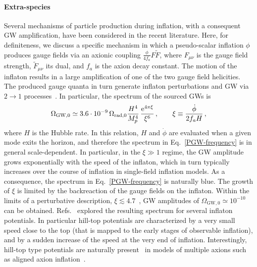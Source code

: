 \documentclass[11pt,a4paper]{article}
\begin{document}
\paragraph{Extra-species}
Several mechanisms of particle production during inflation, with a consequent GW amplification, have been considered in the recent literature. Here, for definiteness, we discuss a specific mechanism in which a pseudo-scalar inflation $\phi$ produces gauge fields via an axionic coupling $\frac{\phi }{4 f_a} F {\tilde F}$,  where $F_{\mu \nu}$ is the gauge field strength,  ${\tilde F}_{\mu \nu}$ its dual, and $f_a$ is the axion decay constant. The motion of the inflaton results in a large amplification of one of the two gauge field helicities. The produced gauge quanta in turn generate inflaton perturbations and GW via $2 \to 1$ processes~\cite{Barnaby:2010vf,Sorbo:2011rz}. In particular, the spectrum of the sourced GWs is~\cite{Barnaby:2010vf}
%
\begin{equation}
\Omega_{\rm GW, 0} \simeq 3.6 \cdot 10^{-9} \, \Omega_{\text{rad},0} \frac{H^4}{M_p^4} \, \frac{{\rm e}^{4 \pi \xi}}{\xi^6}\,, \qquad
\xi \equiv \frac{\dot{\phi}}{2 f_a H} \,,
\label{PGW-frequency}
\end{equation}
%
where $H$ is the Hubble rate. In this relation, $H$ and $\dot{\phi}$ are evaluated when a given mode exits the horizon, and therefore the spectrum in Eq.~\eqref{PGW-frequency} is in general scale-dependent. In particular, in the $\xi \gg 1$ regime, the GW amplitude grows exponentially with  the speed of the inflaton, which in turn typically increases over the course of inflation in single-field inflation models. As a consequence, the spectrum in Eq.~\eqref{PGW-frequency} is naturally blue. The growth of $\xi$ is limited by the backreaction of the gauge fields on the inflaton. {Within the limits of a perturbative description, $\xi \lesssim 4.7$~\cite{Peloso:2016gqs}, GW amplitudes of $\Omega_{\text{GW},0} \simeq 10^{-10}$ can be obtained.} Refs.~\cite{Domcke:2016bkh,Garcia-Bellido:2016dkw} explored the resulting spectrum for several inflaton potentials. In particular hill-top potentials are characterized by a very small speed close to the top (that is mapped to the early stages of observable inflation), and by a sudden increase of the speed at the very end of inflation. Interestingly, hill-top type potentials are naturally present~\cite{Peloso:2015dsa} in models of multiple axions such as aligned axion inflation~\cite{Kim:2004rp}.
%
\end{document}
